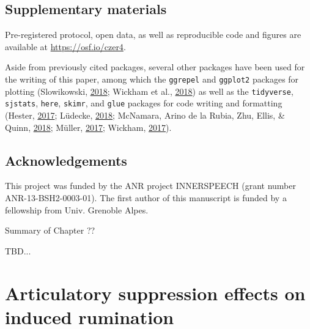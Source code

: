 \documentclass[a4paper,12pt,twoside,openright,oldfontcommands]{memoir}
\newcommand\getcurrentref[1]{
 \ifnumequal{\value{#1}}{0}
  {??}
  {\the\value{#1}}
}
\begin{document}
\hypertarget{suppCh5}{%
\section{Supplementary materials}\label{suppCh5}}

Pre-registered protocol, open data, as well as reproducible code and figures are available at \url{https://osf.io/czer4}.

Aside from previously cited packages, several other packages have been used for the writing of this paper, among which the \texttt{ggrepel} and \texttt{ggplot2} packages for plotting (Slowikowski, \protect\hyperlink{ref-R-ggrepel}{2018}; Wickham et al., \protect\hyperlink{ref-R-ggplot2}{2018}) as well as the \texttt{tidyverse}, \texttt{sjstats}, \texttt{here}, \texttt{skimr}, and \texttt{glue} packages for code writing and formatting (Hester, \protect\hyperlink{ref-R-glue}{2017}; Lüdecke, \protect\hyperlink{ref-R-sjstats}{2018}; McNamara, Arino de la Rubia, Zhu, Ellis, \& Quinn, \protect\hyperlink{ref-R-skimr}{2018}; Müller, \protect\hyperlink{ref-R-here}{2017}; Wickham, \protect\hyperlink{ref-R-tidyverse}{2017}).

\hypertarget{acknowledgements-2}{%
\section{Acknowledgements}\label{acknowledgements-2}}

This project was funded by the ANR project INNERSPEECH (grant number ANR-13-BSH2-0003-01). The first author of this manuscript is funded by a fellowship from Univ. Grenoble Alpes.

\newpage

\begin{vplace}[1]

\begin{summary}{Summary of Chapter\getcurrentref{chapter}}

TBD...

\end{summary}

\end{vplace}

\hypertarget{chap6}{%
\chapter{Articulatory suppression effects on induced rumination}\label{chap6}}
\end{document}
